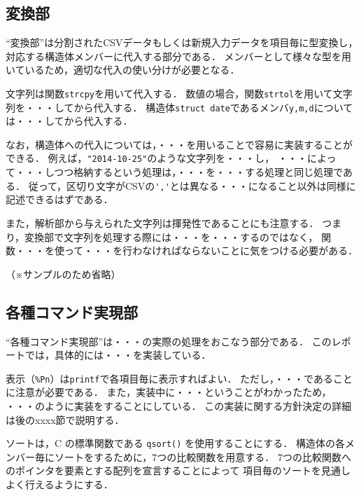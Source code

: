 \documentclass[a4j,11pt]{jarticle}
\begin{document}
\subsection{変換部} \label{sec:exchange}

``変換部''は分割されたCSVデータもしくは新規入力データを項目毎に型変換し，
対応する構造体メンバーに代入する部分である．
メンバーとして様々な型を用いているため，適切な代入の使い分けが必要となる．

文字列は関数\verb|strcpy|を用いて代入する．
数値の場合，関数\verb|strtol|を用いて文字列を・・・してから代入する．
構造体\verb|struct date|であるメンバ\verb|y,m,d|については・・・してから代入する．

なお，構造体への代入については，・・・を用いることで容易に実装することができる．
例えば，\verb|"2014-10-25"|のような文字列を・・・し，
・・・によって・・・しつつ格納するという処理は，・・・を・・・する処理と同じ処理である．
従って，区切り文字がCSVの\verb|','|とは異なる・・・になること以外は同様に記述できるはずである．

また，解析部から与えられた文字列は揮発性であることにも注意する．
つまり，変換部で文字列を処理する際には・・・を・・・するのではなく，
関数・・・を使って・・・を行わなければならないことに気をつける必要がある．

（※サンプルのため省略）

\subsection{各種コマンド実現部} \label{sec:command}

``各種コマンド実現部''は・・・の実際の処理をおこなう部分である．
このレポートでは，具体的には・・・を実装している．

表示（\verb|%Pn|）は\verb|printf|で各項目毎に表示すればよい．
ただし，・・・であることに注意が必要である．
また，実装中に・・・ということがわかったため，
・・・のように実装をすることにしている．
この実装に関する方針決定の詳細は後のxxxx節で説明する．

ソートは，C の標準関数である \verb|qsort()| を使用することにする．
構造体の各メンバー毎にソートをするために，7つの比較関数を用意する．
7つの比較関数へのポインタを要素とする配列を宣言することによって
項目毎のソートを見通しよく行えるようにする．
\end{document}
